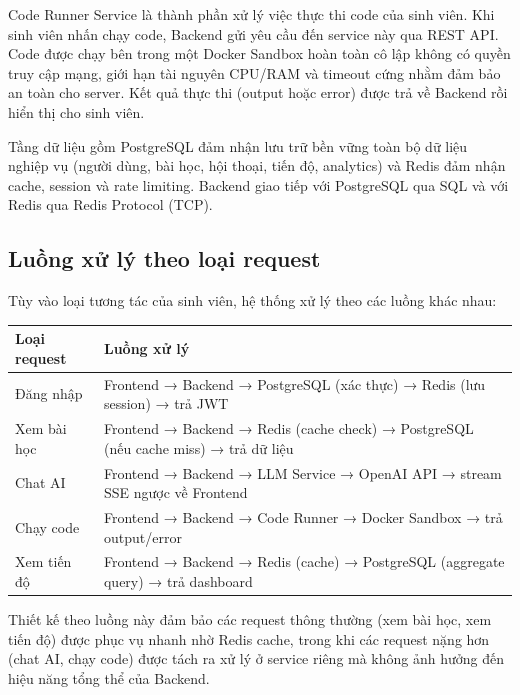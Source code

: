 \documentclass[../main.tex]{subfiles}
\begin{document}
Code Runner Service là thành phần xử lý việc thực thi code của sinh viên. Khi sinh viên nhấn chạy code, Backend gửi yêu cầu đến service này qua REST API. Code được chạy bên trong một Docker Sandbox hoàn toàn cô lập không có quyền truy cập mạng, giới hạn tài nguyên CPU/RAM và timeout cứng nhằm đảm bảo an toàn cho server. Kết quả thực thi (output hoặc error) được trả về Backend rồi hiển thị cho sinh viên.

Tầng dữ liệu gồm PostgreSQL đảm nhận lưu trữ bền vững toàn bộ dữ liệu nghiệp vụ (người dùng, bài học, hội thoại, tiến độ, analytics) và Redis đảm nhận cache, session và rate limiting. Backend giao tiếp với PostgreSQL qua SQL và với Redis qua Redis Protocol (TCP).

\subsection{Luồng xử lý theo loại request}

Tùy vào loại tương tác của sinh viên, hệ thống xử lý theo các luồng khác nhau:


{
\renewcommand{\arraystretch}{1.5}
\begin{tabularx}{\textwidth}{|p{3.5cm}|>{\raggedright\arraybackslash}X|}
\caption{Ví dụ luồng xử lý theo loại request}
\label{tab:vi-du-luong-xu-ly-theo-loai-request}
\\
\hline
\textbf{Loại request} & \textbf{Luồng xử lý} \\
\hline
Đăng nhập & Frontend → Backend → PostgreSQL (xác thực) → Redis (lưu session) → trả JWT \\
\hline
Xem bài học & Frontend → Backend → Redis (cache check) → PostgreSQL (nếu cache miss) → trả dữ liệu \\
\hline
Chat AI & Frontend → Backend → LLM Service → OpenAI API → stream SSE ngược về Frontend \\
\hline
Chạy code & Frontend → Backend → Code Runner → Docker Sandbox → trả output/error \\
\hline
Xem tiến độ & Frontend → Backend → Redis (cache) → PostgreSQL (aggregate query) → trả dashboard \\
\hline
\end{tabularx}
}

Thiết kế theo luồng này đảm bảo các request thông thường (xem bài học, xem tiến độ) được phục vụ nhanh nhờ Redis cache, trong khi các request nặng hơn (chat AI, chạy code) được tách ra xử lý ở service riêng mà không ảnh hưởng đến hiệu năng tổng thể của Backend.
\end{document}
